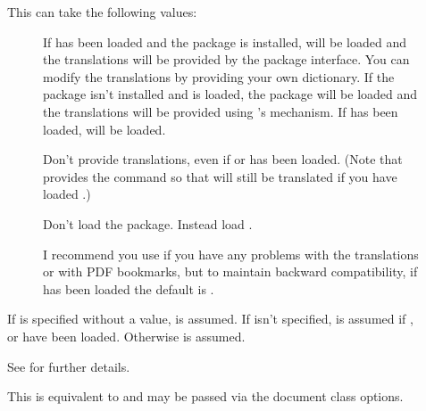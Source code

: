 \documentclass[report,inlinetitle]{nlctdoc}
\begin{document}
\begin{description}
\item[] This can take the following values:

  \begin{description}
  \item[{}] If  has been loaded
  and the  package is installed, 
  will be loaded and the translations will be provided by the
   package interface. You can modify the 
  translations by providing your own dictionary. If the 
   package isn't installed and  is
  loaded, the  package will 
  be loaded and the translations will be provided using 's
   mechanism. If 
   has been loaded, 
  will be loaded.

  \item[{}] Don't provide translations, even
  if  or  has been loaded.
  (Note that  provides the command 
  so that will still be translated if you have loaded .)

  \item[{}] Don't load the 
package. Instead load .

\begin{important}
I recommend you use  if you have any
problems with the translations or with PDF bookmarks, but to maintain backward
compatibility, if  has been loaded the default is
.
\end{important}

  \end{description}

  If  is specified without a value,
   is assumed. If  isn't
specified,  is assumed if , 
 or  have been loaded. Otherwise
 is assumed.

See  for further details.

\item[] This is equivalent to
 and may be passed via the document class
options.


\end{description}
\end{document}
